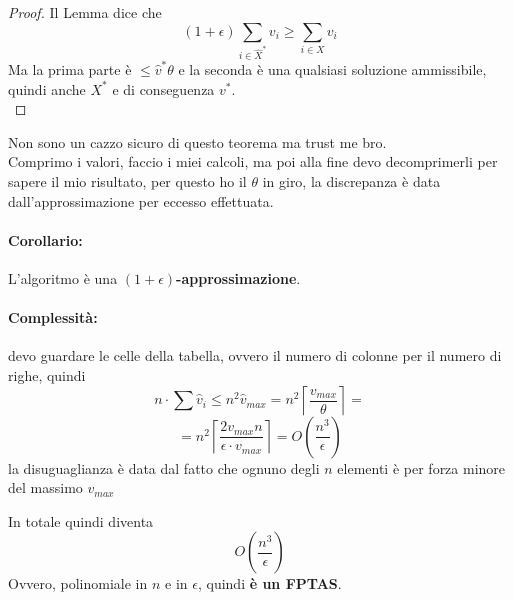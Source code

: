 \begin{proof}
	Il Lemma dice che
	$$ (1 + \epsilon) \sum_{i \in \hat X^\ast} v_i \geq \sum_{i \in X} v_i $$
	Ma la prima parte è $\leq \hat v^\ast \theta$ e la seconda è una qualsiasi soluzione ammissibile, quindi anche $X^\ast$ e di conseguenza $v^\ast$.\\
\end{proof}

Non sono un cazzo sicuro di questo teorema ma trust me bro.\\

Comprimo i valori, faccio i miei calcoli, ma poi alla fine devo decomprimerli per sapere il mio risultato, per questo ho il $\theta$ in giro, la discrepanza è data dall'approssimazione per eccesso effettuata.\\

\paragraph{Corollario:} L'algoritmo è una \textbf{$(1 + \epsilon)$-approssimazione}.\\

\paragraph{Complessità:} devo guardare le celle della tabella, ovvero il numero di colonne per il numero di righe, quindi 
$$ n \cdot \sum \hat v_i \leq n^2 \hat v_{max} = n^2 \left\lceil \frac{v_{max}}{\theta} \right\rceil = $$
$$ = n^2 \left\lceil \frac{2 v_{max} n}{\epsilon \cdot v_{max}} \right\rceil = O\left(\frac{n^3}{\epsilon}\right) $$
la disuguaglianza è data dal fatto che ognuno degli $n$ elementi è per forza minore del massimo $v_{max}$

In totale quindi diventa
$$ O \left(\frac{n^3}{\epsilon}\right)$$
Ovvero, polinomiale in $n$ e in $\epsilon$, quindi \textbf{è un FPTAS}.\\

\newpage

